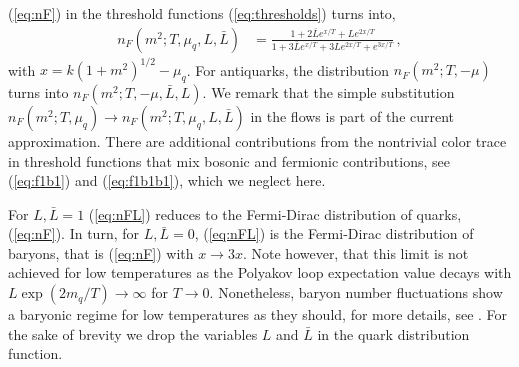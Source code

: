 \documentclass[%
reprint,
superscriptaddress,
showpacs,preprintnumbers,
 amsmath,amssymb,
 aps,
prd,
]{revtex4-1}
\def\eq#1{(\ref{#1})}
\begin{document}
\eq{eq:nF} in the threshold functions \eq{eq:thresholds} turns into,
\begin{align}\label{eq:nFL}
  n_F(m^2;T,\mu_q,L,\bar{L})
  &=\frac{1+2\bar{L}e^{x/T}+
    Le^{2x/T}}{1+3\bar{L}e^{x/T}+3Le^{2x/T}+e^{3x/T}}\,,
\end{align} 
with $x=k(1+m^2)^{1/2}-\mu_q$. For antiquarks, the distribution
$n_{F}(m^2;T,-\mu)$ turns into $n_F(m^2;T,-\mu,\bar L, L)$. We remark
that the simple substitution
$n_{F}(m^{2};T,\mu_q)\to n_F(m^2;T,\mu_q,L,\bar{L})$ in the flows is
part of the current approximation. There are additional contributions
from the nontrivial color trace in threshold functions that mix
bosonic and fermionic contributions, see \eq{eq:f1b1} and
\eq{eq:f1b1b1}, which we neglect here.

For $L,\bar L=1$ \eq{eq:nFL} reduces to the Fermi-Dirac distribution
of quarks, \eq{eq:nF}. In turn, for $L,\bar L=0$, \eq{eq:nFL} is the
Fermi-Dirac distribution of baryons, that is \eq{eq:nF} with
$x\to 3 x$. Note however, that this limit is not achieved for low
temperatures as the Polyakov loop expectation value decays with
$L \exp(2 m_q/T)\to\infty$ for $T\to 0$.  Nonetheless, baryon number
fluctuations show a baryonic regime for low temperatures as they
should, for more details, see \cite{Fu:2015naa}. For the sake of
brevity we drop the variables $L$ and $\bar{L}$ in the quark
distribution function.
\end{document}
